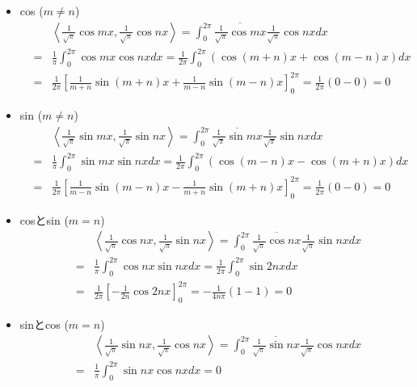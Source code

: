 \documentclass[a4paper,11pt]{jsarticle}
\begin{document}
\begin{itemize}
  \item cos ($m \neq n$)
    \begin{eqnarray*}
      && \left<\frac{1}{\sqrt{\pi}}\cos{mx}, \frac{1}{\sqrt{\pi}}\cos{nx}\right>
      = \int_{0}^{2\pi}{\overline{\frac{1}{\sqrt{\pi}}\cos{mx}}\frac{1}{\sqrt{\pi}}\cos{nx}}dx \\
      &=& \frac{1}{\pi}\int_{0}^{2\pi}{\cos{mx}\cos{nx}}dx
      = \frac{1}{2\pi}\int_{0}^{2\pi}{\left(\cos{(m + n)x} + \cos{(m - n)x}\right)}dx \\
      &=& \frac{1}{2\pi}\left[\frac{1}{m + n}\sin{(m + n)x} + \frac{1}{m - n}\sin{(m - n)x}\right]_{0}^{2\pi}
      = \frac{1}{2\pi}\left(0 - 0\right) = 0
    \end{eqnarray*}
  \item sin ($m \neq n$)
    \begin{eqnarray*}
      && \left<\frac{1}{\sqrt{\pi}}\sin{mx}, \frac{1}{\sqrt{\pi}}\sin{nx}\right>
      = \int_{0}^{2\pi}{\overline{\frac{1}{\sqrt{\pi}}\sin{mx}}\frac{1}{\sqrt{\pi}}\sin{nx}}dx \\
      &=& \frac{1}{\pi}\int_{0}^{2\pi}{\sin{mx}\sin{nx}}dx
      = \frac{1}{2\pi}\int_{0}^{2\pi}{\left(\cos{(m - n)x} - \cos{(m + n)x}\right)}dx \\
      &=& \frac{1}{2\pi}\left[\frac{1}{m - n}\sin{(m - n)x} - \frac{1}{m + n}\sin{(m + n)x}\right]_{0}^{2\pi}
      = \frac{1}{2\pi}\left(0 - 0\right) = 0
    \end{eqnarray*}
  \item cosとsin ($m = n$)
    \begin{eqnarray*}
      && \left<\frac{1}{\sqrt{\pi}}\cos{nx}, \frac{1}{\sqrt{\pi}}\sin{nx}\right>
      = \int_{0}^{2\pi}{\overline{\frac{1}{\sqrt{\pi}}\cos{nx}}\frac{1}{\sqrt{\pi}}\sin{nx}}dx \\
      &=& \frac{1}{\pi}\int_{0}^{2\pi}{\cos{nx}\sin{nx}}dx
      = \frac{1}{2\pi}\int_{0}^{2\pi}{\sin{2nx}}dx \\
      &=& \frac{1}{2\pi}\left[-\frac{1}{2n}\cos{2nx}\right]_0^{2\pi}
      = -\frac{1}{4n\pi}\left(1 - 1\right) = 0
    \end{eqnarray*}
  \item sinとcos ($m = n$)
    \begin{eqnarray*}
      && \left<\frac{1}{\sqrt{\pi}}\sin{nx}, \frac{1}{\sqrt{\pi}}\cos{nx}\right>
      = \int_{0}^{2\pi}{\overline{\frac{1}{\sqrt{\pi}}\sin{nx}}\frac{1}{\sqrt{\pi}}\cos{nx}}dx \\
      &=& \frac{1}{\pi}\int_{0}^{2\pi}{\sin{nx}\cos{nx}}dx = 0

\end{eqnarray*}
\end{itemize}
\end{document}
